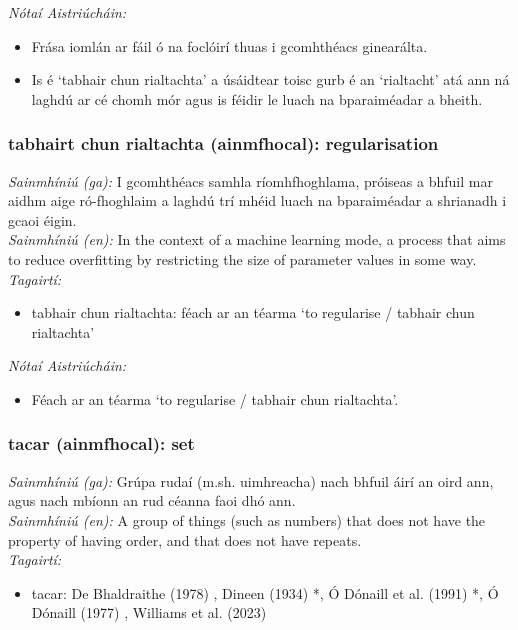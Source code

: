  \noindent \textit{Nótaí Aistriúcháin:}
\begin{itemize}
	\item Frása iomlán ar fáil ó na foclóirí thuas i gcomhthéacs ginearálta.
	\item Is é `tabhair chun rialtachta' a úsáidtear toisc gurb é an `rialtacht' atá ann ná laghdú ar cé chomh mór agus is féidir le luach na bparaiméadar a bheith.
\end{itemize}


\subsubsection*{tabhairt chun rialtachta (ainmfhocal): regularisation}
 \noindent \textit{Sainmhíniú (ga):} I gcomhthéacs samhla ríomhfhoghlama, próiseas a bhfuil mar aidhm aige ró-fhoghlaim a laghdú trí mhéid luach na bparaiméadar a shrianadh i gcaoi éigin.
\\
 \noindent \textit{Sainmhíniú (en):} In the context of a machine learning mode, a process that aims to reduce overfitting by restricting the size of parameter values in some way.
\\
 \noindent \textit{Tagairtí:}
\begin{itemize}
	\item tabhair chun rialtachta: féach ar an téarma `to regularise / tabhair chun rialtachta'
\end{itemize}

 \noindent \textit{Nótaí Aistriúcháin:}
\begin{itemize}
	\item Féach ar an téarma `to regularise / tabhair chun rialtachta'.
\end{itemize}


\subsubsection*{tacar (ainmfhocal): set}
 \noindent \textit{Sainmhíniú (ga):} Grúpa rudaí (m.sh. uimhreacha) nach bhfuil áirí an oird ann, agus nach mbíonn an rud céanna faoi dhó ann.
\\
 \noindent \textit{Sainmhíniú (en):} A group of things (such as numbers) that does not have the property of having order, and that does not have repeats.
\\
 \noindent \textit{Tagairtí:}
\begin{itemize}
	\item tacar: De Bhaldraithe (1978) \cite{de-bhaldraithe}, Dineen (1934) \cite{dineen}*, Ó Dónaill et al. (1991) \cite{focloir-beag}*, Ó Dónaill (1977) \cite{odonaill}, Williams et al. (2023) \cite{storchiste}
\end{itemize}

